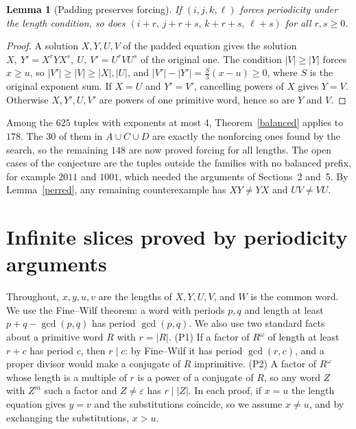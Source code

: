 \documentclass[11pt]{article}
\newtheorem{lemma}[theorem]{Lemma}
\newcommand{\eps}{\varepsilon}
\theoremstyle{remark}\newtheorem*{remark}{Remark}
\begin{document}
\begin{lemma}[Padding preserves forcing]\label{padding}
If \((i,j,k,\ell)\) forces periodicity under the length condition, so does \((i+r,\,j+r+s,\,k+r+s,\,\ell+s)\) for all \(r,s\ge0\).
\end{lemma}
\begin{proof}
A solution \(X,Y,U,V\) of the padded equation gives the solution \(X,\ Y'=X^rYX^s,\ U,\ V'=U^rVU^s\) of the original one. The condition \(|V|\ge|Y|\) forces \(x\ge u\), so \(|V'|\ge|V|\ge|X|,|U|\), and \(|V'|-|Y'|=\tfrac{S}{3}(x-u)\ge0\), where \(S\) is the original exponent sum. If \(X=U\) and \(Y'=V'\), cancelling powers of \(X\) gives \(Y=V\). Otherwise \(X,Y',U,V'\) are powers of one primitive word, hence so are \(Y\) and \(V\).
\end{proof}
Among the \(625\) tuples with exponents at most \(4\), Theorem~\ref{balanced} applies to \(178\). The \(30\) of them in \(A\cup C\cup D\) are exactly the nonforcing ones found by the search, so the remaining \(148\) are now proved forcing for all lengths. The open cases of the conjecture are the tuples outside the families with no balanced prefix, for example \(2011\) and \(1001\), which needed the arguments of Sections~2 and~5. By Lemma~\ref{perred}, any remaining counterexample has \(XY\ne YX\) and \(UV\ne VU\).

\section{Infinite slices proved by periodicity arguments}
Throughout, \(x,y,u,v\) are the lengths of \(X,Y,U,V\), and \(W\) is the common word. We use the Fine--Wilf theorem: a word with periods \(p,q\) and length at least \(p+q-\gcd(p,q)\) has period \(\gcd(p,q)\). We also use two standard facts about a primitive word \(R\) with \(r=|R|\). (P1) If a factor of \(R^\omega\) of length at least \(r+c\) has period \(c\), then \(r\mid c\): by Fine--Wilf it has period \(\gcd(r,c)\), and a proper divisor would make a conjugate of \(R\) imprimitive. (P2) A factor of \(R^\omega\) whose length is a multiple of \(r\) is a power of a conjugate of \(R\), so any word \(Z\) with \(Z^m\) such a factor and \(Z\ne\eps\) has \(r\mid |Z|\). In each proof, if \(x=u\) the length equation gives \(y=v\) and the substitutions coincide, so we assume \(x\ne u\), and by exchanging the substitutions, \(x>u\).
\end{document}
